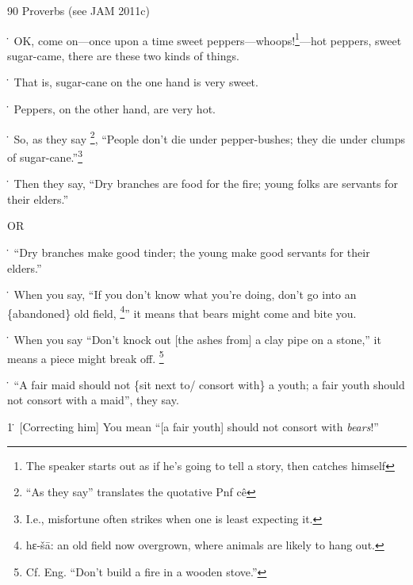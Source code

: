 
90 Proverbs (see JAM 2011c)

\. OK, come on---once upon a time sweet peppers---whoops!\footnote{The speaker starts out as if he's going to tell a story, then catches himself}---hot peppers, sweet
sugar-came, there are these two kinds of things.

\. That is, sugar-cane on the one hand is very sweet.

\. Peppers, on the other hand, are very hot.

\. So, as they say \footnote{``As they say'' translates the quotative Pnf cê}, ``People don't die under pepper-bushes; they die under
clumps of sugar-cane.''\footnote{I.e., misfortune often strikes when one is least expecting it.}

\. Then they say, ``Dry branches are food for the fire; young folks are servants
for their elders.''

OR

\. ``Dry branches make good tinder; the young make good servants for their elders.''

\. When you say, ``If you don't know what you're doing, don't go into an \{abandoned\}
old field, \footnote{hɛ-šā: an old field now overgrown, where animals are likely to hang out.}'' it means that bears might come and bite you.

\. When you say ``Don't knock out [the ashes from] a clay pipe on a stone,'' it
means a piece might break off. \footnote{Cf. Eng. ``Don't build a fire in a wooden stove.''}

\. ``A fair maid should not \{sit next to/ consort with\} a youth; a fair youth
should not consort with a maid'', they say.

1\. [Correcting him] You mean ``[a fair youth] should not consort with \textit{bears}!''
